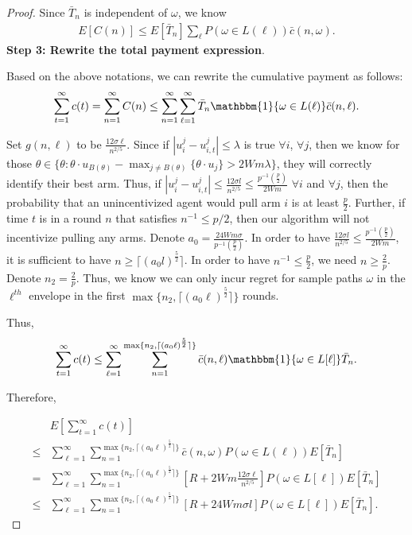 \begin{proof}
Since $\bar{T}_{n}$ is independent of $\omega$, we know
\begin{align}
E[C(n)]\leq E[\bar{T}_{n}]\sum_{\ell}P(\omega\in L(\ell))\bar{c}(n,\omega). \nonumber
\end{align}
\noindent\textbf{Step 3: Rewrite the total payment expression}.

Based on the above notations, we can rewrite the cumulative payment as follows:
\begin{align}
\sum_{t=1}^{\infty}c(t) =\sum_{n=1}^{\infty}C(n)
\leq  \sum_{n=1}^{\infty}\sum_{\ell=1}^{\infty}\bar{T}_{n}\mathbbm{1}\{\omega\in L(\ell)\}\bar{c}(n,\ell). \nonumber
\end{align}

Set $g(n,\ell)$ to be $\frac{12\sigma \ell}{n^{2/5}}$. Since if $|u_{i}^{j}-u_{i,t}^{j}|\leq \lambda$ is true $\forall i$, $\forall j$, then we know for those $\theta\in \{\theta:\theta\cdot u_{B(\theta)}-\max_{j\neq B(\theta)}\{\theta \cdot u_{j}\}> 2Wm\lambda\}$, they will correctly identify their best arm. Thus, if $|u_{i}^{j}-u_{i,t}^{j}|\leq \frac{12\sigma l}{n^{2/5}} \leq \frac{p^{-1}(\frac{p}{2})}{2Wm}$ $\forall i$ and $\forall j$, then the probability that an unincentivized agent would pull arm $i$ is at least $\frac{p}{2}$. Further, if time $t$ is in a round $n$ that satisfies $n^{-1}\leq p/2$, then our algorithm will not incentivize pulling any arms. Denote $a_0=\frac{24Wm\sigma}{p^{-1}(\frac{p}{2})}$. In order to have $\frac{12\sigma l}{n^{2/5}}\leq \frac{p^{-1}(\frac{p}{2})}{2Wm}$, it is sufficient to have $n\geq \lceil (a_{0} l)^\frac{5}{2} \rceil$. In order to have $n^{-1}\leq \frac{p}{2}$, we need $n\geq \frac{2}{p}$. Denote $n_2=\frac{2}{p}$. Thus, we know we can only incur regret for sample paths $\omega$ in the $\ell^{th}$ envelope in the first $\max\{n_2,\lceil (a_0 \ell)^\frac{5}{2} \rceil\}$ rounds.

Thus,
\begin{align}
\sum_{t=1}^{\infty}c(t)\leq\sum_{\ell=1}^{\infty}\sum_{n=1}^{\max\{n_2,\lceil (a_0 \ell)^\frac{5}{2} \rceil\}}\bar{c}(n,\ell)\mathbbm{1}\{\omega\in L[\ell]\}\bar{T}_{n}. \nonumber
\end{align}

Therefore,

\begin{align}
&E\left[\sum_{t=1}^{\infty}c(t)\right] \nonumber\\
\leq &\sum_{\ell=1}^{\infty}\sum_{n=1}^{\max\{n_2,\lceil (a_0 \ell)^\frac{5}{2} \rceil\}}\bar{c}(n,\omega)P(\omega \in L(\ell))E[\bar{T}_{n}] \nonumber \\
=&\sum_{\ell=1}^{\infty}\sum_{n=1}^{\max\{n_2,\lceil (a_0 \ell)^\frac{5}{2} \rceil\}}\left[R+2Wm\frac{12\sigma \ell}{n^{2/5}}\right]P(\omega\in L[\ell])E[\bar{T}_{n}] \nonumber \\
\leq &\sum_{\ell=1}^{\infty}\sum_{n=1}^{\max\{n_2,\lceil (a_0 \ell)^\frac{5}{2} \rceil\}}\left[R+24Wm\sigma l\right]P(\omega\in L[\ell])E[\bar{T}_{n}]. \nonumber
\end{align}


\end{proof}
